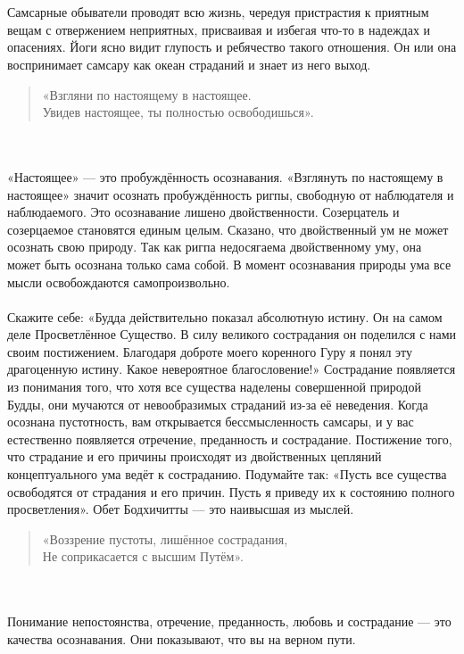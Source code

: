 \newpage
\\ \\ Самсарные обыватели проводят всю жизнь, чередуя пристрастия к приятным вещам с отвержением неприятных, присваивая и избегая что-то в надеждах и опасениях. Йоги ясно видит глупость и ребячество такого отношения. Он или она воспринимает самсару как океан страданий и знает из него выход.
\begin{verse}
«Взгляни по настоящему в настоящее.\\
Увидев настоящее, ты полностью освободишься».
\end{verse}
\\ \\ «Настоящее» — это пробуждённость осознавания. «Взглянуть по настоящему в настоящее» значит осознать пробуждённость ригпы, свободную от наблюдателя и наблюдаемого. Это осознавание лишено двойственности. Созерцатель и созерцаемое становятся единым целым. Сказано, что двойственный ум не может осознать свою природу. Так как ригпа недосягаема двойственному уму, она может быть осознана только сама собой. В момент осознавания природы ума все мысли освобождаются самопроизвольно.
\\ \\ Скажите себе: «Будда действительно показал абсолютную истину. Он на самом деле Просветлённое Существо. В силу великого сострадания он поделился с нами своим постижением. Благодаря доброте моего коренного Гуру я понял эту драгоценную истину. Какое невероятное благословение!» Сострадание появляется из понимания того, что хотя все существа наделены совершенной природой Будды, они мучаются от невообразимых страданий из-за её неведения. Когда осознана пустотность, вам открывается бессмысленность самсары, и у вас естественно появляется отречение, преданность и сострадание. Постижение того, что страдание и его причины происходят из двойственных цепляний концептуального ума ведёт к состраданию. Подумайте так: «Пусть все существа освободятся от страдания и его причин. Пусть я приведу их к состоянию полного просветления». Обет Бодхичитты — это наивысшая из мыслей.
\newpage
\begin{verse}
«Воззрение пустоты, лишённое сострадания,\\
Не соприкасается с высшим Путём».
\end{verse}
\\ \\ Понимание непостоянства, отречение, преданность, любовь и сострадание — это качества осознавания. Они показывают, что вы на верном пути.
